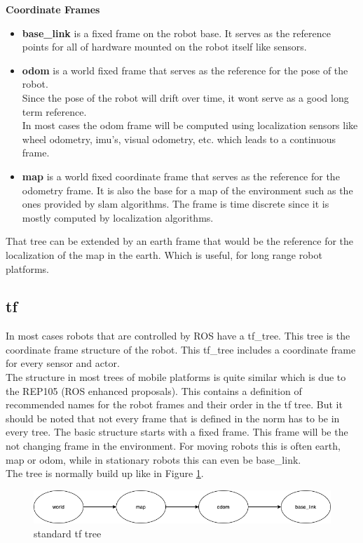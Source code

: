 	\textbf{Coordinate Frames}
	\begin{itemize}
		\item \textbf{base\_link} is a fixed frame on the robot base. It serves as the reference points for all of hardware mounted on the robot itself like sensors.
		\item \textbf{odom} is a world fixed frame that serves as the reference for the pose of the robot.\\ Since the pose of the robot will drift over time, it wont serve as a good long term reference.\\In most cases the odom frame will be computed using localization sensors like wheel odometry, imu's, visual odometry, etc. which leads to a continuous frame.
		\item \textbf{map} is a world fixed coordinate frame that serves as the reference for the odometry frame. It is also the base for a map of the environment such as the ones provided by slam algorithms. The frame is time discrete since it is mostly computed by localization algorithms.
	\end{itemize}
	
	That tree can be extended by an earth frame that would be the reference for the localization of the map in the earth. Which is useful, for long range robot platforms.\cite{REP105}
	
	
	
\subsection{tf}
In most cases robots that are controlled by ROS have a tf\_tree. This tree is the coordinate frame structure of the robot. This tf\_tree includes a coordinate frame for every sensor and actor.\\
 The structure in most trees of mobile platforms is quite similar which is due to the REP105 (ROS enhanced proposals). This contains a definition of recommended names for the robot frames and their order in the tf tree. But it should be noted that not every frame that is defined in the norm has to be in every tree. The basic structure starts with a fixed frame. This frame will be the not changing frame in the environment. For moving robots this is often earth, map or odom, while in stationary robots this can even be base\_link.\\
 

The tree is normally build up like in Figure \ref{stdtftree}.


\begin{figure}[H]
	\includegraphics[width=\textwidth]{Pictures/tf standard tree}
	\caption{standard tf tree}
	\label{stdtftree}
\end{figure}

